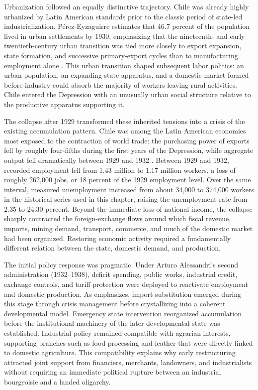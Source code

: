 Urbanization followed an equally distinctive trajectory. Chile was already highly urbanized by Latin American standards prior to the classic period of state-led industrialization. P\'erez-Eyzaguirre estimates that 46.7 percent of the population lived in urban settlements by 1930, emphasizing that the nineteenth- and early twentieth-century urban transition was tied more closely to export expansion, state formation, and successive primary-export cycles than to manufacturing employment alone \citep{PerezEyzaguirre2017}. This urban transition shaped subsequent labor politics: an urban population, an expanding state apparatus, and a domestic market formed before industry could absorb the majority of workers leaving rural activities. Chile entered the Depression with an unusually urban social structure relative to the productive apparatus supporting it.

The collapse after 1929 transformed these inherited tensions into a crisis of the existing accumulation pattern. Chile was among the Latin American economies most exposed to the contraction of world trade: the purchasing power of exports fell by roughly four-fifths during the first years of the Depression, while aggregate output fell dramatically between 1929 and 1932 \citep{BertolaOcampo2012,BulmerThomas2003}. Between 1929 and 1932, recorded employment fell from 1.43 million to 1.17 million workers, a loss of roughly 262,000 jobs, or 18 percent of the 1929 employment level. Over the same interval, measured unemployment increased from about 34,000 to 374,000 workers in the historical series used in this chapter, raising the unemployment rate from 2.35 to 24.30 percent. Beyond the immediate loss of national income, the collapse sharply contracted the foreign-exchange flows around which fiscal revenue, imports, mining demand, transport, commerce, and much of the domestic market had been organized. Restoring economic activity required a fundamentally different relation between the state, domestic demand, and production.

The initial policy response was pragmatic. Under Arturo Alessandri's second administration (1932--1938), deficit spending, public works, industrial credit, exchange controls, and tariff protection were deployed to reactivate employment and domestic production. As \citet{Silva2007} emphasizes, import substitution emerged during this stage through crisis management before crystallizing into a coherent developmental model. Emergency state intervention reorganized accumulation before the institutional machinery of the later developmental state was established. Industrial policy remained compatible with agrarian interests, supporting branches such as food processing and leather that were directly linked to domestic agriculture. This compatibility explains why early restructuring attracted joint support from financiers, merchants, landowners, and industrialists without requiring an immediate political rupture between an industrial bourgeoisie and a landed oligarchy.

